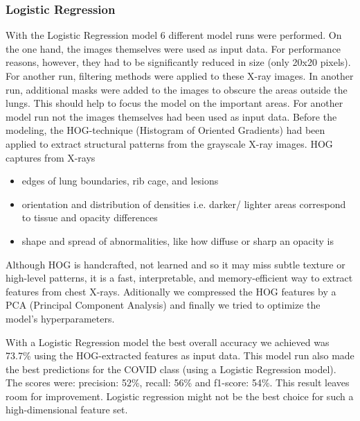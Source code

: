 \documentclass{article}
\begin{document}

\subsubsection{Logistic Regression}
With the Logistic Regression model 6 different model runs were performed. On the one hand, the images themselves were used as input data. For performance reasons, however, they had to be significantly reduced in size (only 20x20 pixels). For another run, filtering methods were applied to these X-ray images. In another run, additional masks were added to the images to obscure the areas outside the lungs. This should help to focus the model on the important areas. 
For another model run not the images themselves had been used as input data. Before the modeling, the HOG-technique (Histogram of Oriented Gradients) had been applied to extract structural patterns from the grayscale X-ray images. HOG captures from X-rays
\begin{itemize}
     \item edges of lung boundaries, rib cage, and lesions
     \item orientation and distribution of densities i.e. darker/ lighter areas correspond to tissue and opacity differences
     \item shape and spread of abnormalities, like how diffuse or sharp an opacity is
\end{itemize}
Although HOG is handcrafted, not learned  and  so it may miss subtle texture or high-level patterns, it is a fast, interpretable, and memory-efficient way to extract features from chest X-rays. 
Aditionally we compressed the HOG features by a PCA (Principal Component Analysis) and finally we tried to optimize the model's hyperparameters. 

With a Logistic Regression model the best overall accuracy we achieved was 73.7\% using the HOG-extracted features as input data. This model run also made the best predictions for the COVID class (using a Logistic Regression model). The scores were:  precision: 52\%, recall: 56\% and f1-score: 54\%. This result leaves room for improvement. Logistic regression might not be the best choice for such a high-dimensional feature set.\\


\end{document}
